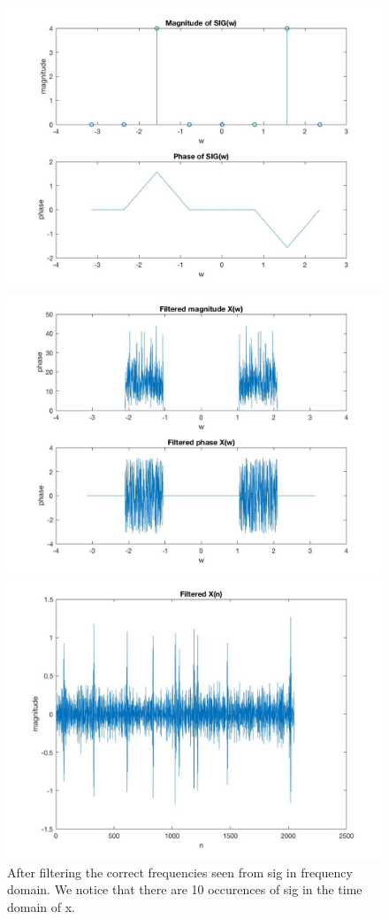 \documentclass{article}
\begin{document}
\begin{figure}[H]
\includegraphics[scale=.5]{Legends2}
\includegraphics[scale=.5]{legends3}
\includegraphics[scale=.5]{Legends4}
After filtering the correct frequencies seen from sig in frequency domain. We notice that there are 10 occurences of sig in the time domain of x.
\end{figure}
\end{document}
